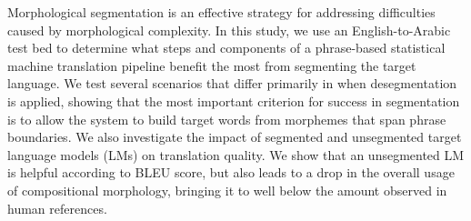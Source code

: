Morphological segmentation is an effective strategy for addressing difficulties caused by morphological complexity. In this study, we use an English-to-Arabic test bed to determine what steps and components of a phrase-based statistical machine translation pipeline benefit the most from segmenting the target language. We test several scenarios that differ primarily in when desegmentation is applied, showing that the most important criterion for success in segmentation is to allow the system to build target words from morphemes that span phrase boundaries. We also investigate the impact of segmented and unsegmented target language models (LMs) on translation quality. We show that an unsegmented LM is helpful according to BLEU score, but also leads to a drop in the overall usage of compositional morphology, bringing it to well below the amount observed in human references.
